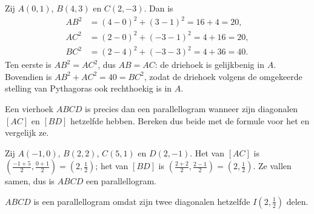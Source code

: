 \begin{example}\label{ex:g10:coordgeom:triangle}
Zij $A(0, 1)$, $B(4, 3)$ en $C(2, -3)$. Dan is
\begin{align*}
AB^2 &= (4-0)^2 + (3-1)^2 = 16 + 4 = 20, \\
AC^2 &= (2-0)^2 + (-3-1)^2 = 4 + 16 = 20, \\
BC^2 &= (2-4)^2 + (-3-3)^2 = 4 + 36 = 40 .
\end{align*}
Ten eerste is $AB^2 = AC^2$, dus $AB = AC$: de driehoek is gelijkbenig in
$A$. Bovendien is $AB^2 + AC^2 = 40 = BC^2$, zodat de driehoek volgens de
omgekeerde stelling van Pythagoras ook rechthoekig is in $A$.
\end{example}

\begin{method}\label{met:g10:coordgeom:parallelogram}
Een vierhoek $ABCD$ is precies dan een parallellogram wanneer zijn
diagonalen $[AC]$ en $[BD]$ hetzelfde  hebben. Bereken dus beide
 met de formule voor het  en vergelijk ze.
\end{method}

\begin{example}\label{ex:g10:coordgeom:parallelogram}
Zij $A(-1, 0)$, $B(2, 2)$, $C(5, 1)$ en $D(2, -1)$. Het  van $[AC]$ is
$\left(\frac{-1+5}{2}, \frac{0+1}{2}\right) = (2, \frac12)$; het  van
$[BD]$ is $\left(\frac{2+2}{2}, \frac{2-1}{2}\right) = (2, \frac12)$. Ze
vallen samen, dus is $ABCD$ een parallellogram.
\end{example}

\begin{omfigure}

{\small $ABCD$ is een parallellogram omdat zijn twee diagonalen hetzelfde
 $I(2, \frac12)$ delen.}
\end{omfigure}

